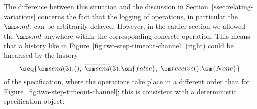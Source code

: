 The difference between this situation and the discussion in
Section~\ref{ssec:relating-variations} concerns the fact that the logging of
operations, in particular the $\overline{\send}$, can be arbitrarily delayed.
However, in the earlier section we allowed the $\overline{\send}$ anywhere
within the corresponding concrete operation.  This means that a history like
in Figure~\ref{fig:two-step-timeout-channel} (right) could be linearised by
the history
\[
\seq{ \send(3)\::(),\; \overline{\send}(3)\::\sm{false},\;
  \receive()\::\sm{None} }
\]
of the specification, where the operations take place in a different order
than for Figure~\ref{fig:two-step-timeout-channel}; this is consistent with a
deterministic specification object.
